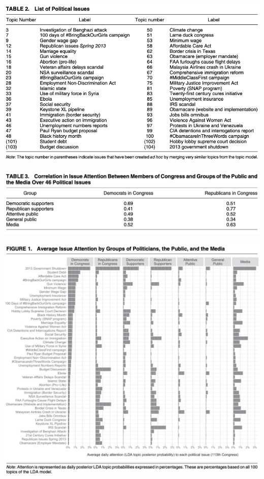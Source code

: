\documentclass[english]{beamer}
\begin{document}
\begin{frame}{}
    \centering
    \includegraphics[width=1 \textwidth]{Images/barbera_issues.png}
\end{frame}

\begin{frame}{}
    \centering
    \includegraphics[width=1 \textwidth]{Images/barbera_corr.png}
\end{frame}

\begin{frame}{}
    \centering
    \includegraphics[width=0.8 \textwidth]{Images/barbera_fig1.png}
\end{frame}
\end{document}
